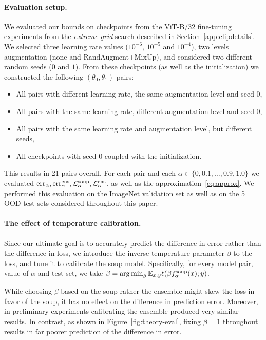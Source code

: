 \paragraph{Evaluation setup.} We evaluated our bounds on checkpoints from the ViT-B/32 fine-tuning experiments from the \emph{extreme grid} search described in Section~\ref{app:clipdetails}. We selected three learning rate values ($10^{-6}$, $10^{-5}$ and $10^{-4}$), two levels augmentation (none and RandAugment+MixUp), and considered two different random seeds ($0$ and $1$). From these checkpoints (as well as the initialization) we constructed the following $(\theta_0, \theta_1)$ pairs:
\begin{itemize}
	\item All pairs with different learning rate, the same augmentation level and seed 0,
	\item All pairs with the same learning rate, different augmentation level and seed 0,
	\item All pairs with the same learning rate and augmentation level, but different seeds,
	\item All checkpoints with seed 0 coupled with the initialization.
\end{itemize}  
This results in 21 pairs overall. For each pair and each $\alpha\in\{0,0.1,\ldots,0.9,1.0\}$ we evaluated $\mathrm{err}_\alpha, \mathrm{err}^{\mathrm{ens}}_\alpha, \mathcal{L}^{\mathrm{soup}}_\alpha, \mathcal{L}^{\mathrm{ens}}_\alpha$, as well as the approximation~\eqref{eq:approx}. We performed this evaluation on the ImageNet validation set as well as on the 5 OOD test sets considered throughout this paper.  

\paragraph{The effect of temperature calibration.}
Since our ultimate goal is to accurately predict the difference in error rather than the difference in loss, we introduce the inverse-temperature parameter $\beta$ to the loss, and tune it to calibrate the soup model. Specifically, for every model pair, value of $\alpha$ and test set, we take $\beta = \operatorname*{arg\,min}_\beta \mathbb{E}_{x,y} \ell(\beta f_\alpha^{\mathrm{soup}}(x); y)$. 

While choosing $\beta$ based on the soup rather the ensemble might skew the loss in favor of the soup, it has no effect on the difference in prediction error. Moreover, in preliminary experiments calibrating the ensemble produced very similar results. In contrast, as shown in Figure~\ref{fig:theory-eval}, fixing $\beta=1$ throughout results in far poorer prediction of the difference in error.  